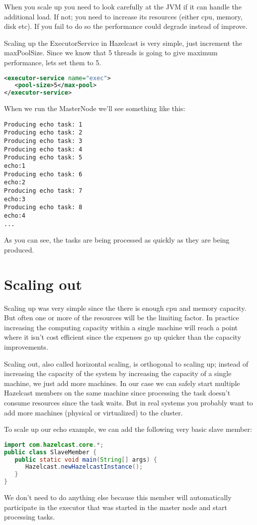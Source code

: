 When you scale up you need to look carefully at the JVM if it can handle the additional load. If not; you need to increase its resources (either cpu, memory, disk etc). If you fail to do so the performance could degrade instead of improve. 

Scaling up the ExecutorService in Hazelcast is very simple, just increment the maxPoolSize. Since we know that 5 threads is going to give maximum performance, lets set them to 5.
\begin{lstlisting}[language=xml]
<executor-service name="exec">
   <pool-size>5</max-pool>
</executor-service>
\end{lstlisting}
When we run the MasterNode we'll see something like this:
\begin{lstlisting}
Producing echo task: 1
Producing echo task: 2
Producing echo task: 3
Producing echo task: 4
Producing echo task: 5
echo:1
Producing echo task: 6
echo:2
Producing echo task: 7
echo:3
Producing echo task: 8
echo:4
...
\end{lstlisting}
As you can see, the tasks are being processed as quickly as they are being produced. 

\section{Scaling out}
Scaling up was very simple since the there is enough cpu and memory capacity. But often one or more of the resources will be the limiting factor. In practice increasing the computing capacity within a single machine will reach a point where it isn't cost efficient since the expenses go up quicker than the capacity improvements.

Scaling out, also called horizontal scaling, is orthogonal to scaling up; instead of increasing the capacity of the system by increasing the capacity of a single machine, we just add more machines. In our case we can safely start multiple Hazelcast members on the same machine since processing the task doesn't consume resources since the task waits. But in real systems you probably want to add more machines (physical or virtualized) to the cluster.

To scale up our echo example, we can add the following very basic slave member:
\begin{lstlisting}[language=java]
import com.hazelcast.core.*;
public class SlaveMember {
   public static void main(String[] args) {
      Hazelcast.newHazelcastInstance();
   }
}
\end{lstlisting}
We don't need to do anything else because this member will automatically participate in the executor that was started in the master node and start processing tasks. 

